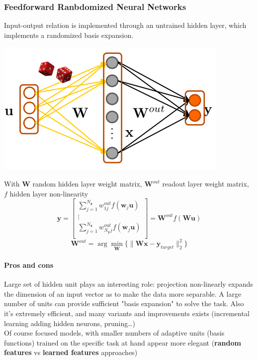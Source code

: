 \documentclass[10pt]{report}
\begin{document}
\subsubsection{Feedforward Ranbdomized Neural Networks} Input-output relation is implemented through an untrained hidden layer, which implements a randomized basis expansion.
\begin{center}
	\includegraphics[scale=0.5]{54.png}
\end{center}
With $\mathbf{W}$ random hidden layer weight matrix, $\mathbf{W}^{out}$ readout layer weight matrix, $f$ hidden layer non-linearity
$$\mathbf{y}=\left[\begin{array}{c }
\sum_{j=1}^{N_\mathbf{x}} w_{1j}^{out}f(\mathbf{w}_j\mathbf{u})\\
\vdots\\
\sum_{j=1}^{N_\mathbf{x}} w_{N_\mathbf{y}j}^{out}f(\mathbf{w}_j\mathbf{u})\\
\end{array}\right] = \mathbf{W}^{out}f(\mathbf{Wu})$$
$$\mathbf{W}^{out}=\arg\min_{\mathbf{W}}\{\|\mathbf{Wx}-\mathbf{y}_{target}\|_2^2\}$$
\paragraph{Pros and cons} Large set of hidden unit plays an interesting role: projection non-linearly expands the dimension of an input vector as to make the data more separable. A large number of units can provide sufficient "basis expansion" to solve the task. Also it's extremely efficient, and many variants and improvements exists (incremental learning adding hidden neurons, pruning\ldots)\\
Of course focused models, with smaller numbers of adaptive units (basis functions) trained on the specific task at hand appear more elegant (\textbf{random features} vs \textbf{learned features} approaches)
\end{document}
